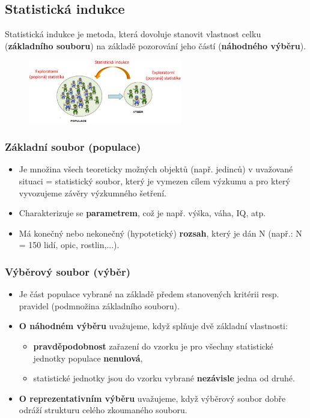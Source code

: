 
\subsection{Statistická indukce}
Statistická indukce je metoda, která dovoluje stanovit vlastnost celku (\textbf{základního souboru}) na základě pozorování jeho částí (\textbf{náhodného výběru}).
\begin{figure}[H]
\centering
\includegraphics[width=0.6\textwidth]{assets/14_stat_ind}
\end{figure}

\subsubsection{Základní soubor (populace)}
\begin{itemize}
	\item Je množina všech teoreticky možných objektů (např. jedinců) v uvažované situaci = statistický soubor, který je vymezen cílem výzkumu a pro který vyvozujeme závěry výzkumného šetření.
	\item Charakterizuje se \textbf{parametrem}, což je např. výška, váha, IQ, atp.
	\item Má konečný nebo nekonečný (hypotetický) \textbf{rozsah}, který je dán N (např.: N = 150 lidí, opic, rostlin,...).
\end{itemize}
\subsubsection{Výběrový soubor (výběr)}
\begin{itemize}
	\item Je část populace vybrané na základě předem stanovených kritérii resp. pravidel (podmnožina základního souboru).
	\item \textbf{O náhodném výběru} uvažujeme, když splňuje dvě základní vlastnosti:
\begin{itemize}
\item \textbf{pravděpodobnost} zařazení do vzorku je pro všechny statistické jednotky populace \textbf{nenulová},
\item statistické jednotky jsou do vzorku vybrané \textbf{nezávisle} jedna od druhé.
\end{itemize}
	\item \textbf{O reprezentativním výběru} uvažujeme, když výběrový soubor dobře odráží strukturu celého zkoumaného souboru.
\end{itemize}
